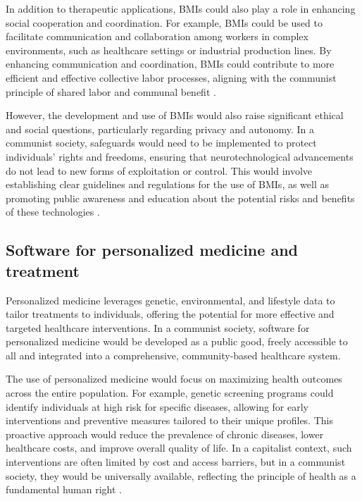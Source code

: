 In addition to therapeutic applications, BMIs could also play a role in enhancing social cooperation and coordination. For example, BMIs could be used to facilitate communication and collaboration among workers in complex environments, such as healthcare settings or industrial production lines. By enhancing communication and coordination, BMIs could contribute to more efficient and effective collective labor processes, aligning with the communist principle of shared labor and communal benefit \cite[pp.~300-305]{kim2021neuroscience}.

However, the development and use of BMIs would also raise significant ethical and social questions, particularly regarding privacy and autonomy. In a communist society, safeguards would need to be implemented to protect individuals' rights and freedoms, ensuring that neurotechnological advancements do not lead to new forms of exploitation or control. This would involve establishing clear guidelines and regulations for the use of BMIs, as well as promoting public awareness and education about the potential risks and benefits of these technologies \cite[pp.~310-315]{thompson2022bmi}.

\subsection{Software for personalized medicine and treatment}

Personalized medicine leverages genetic, environmental, and lifestyle data to tailor treatments to individuals, offering the potential for more effective and targeted healthcare interventions. In a communist society, software for personalized medicine would be developed as a public good, freely accessible to all and integrated into a comprehensive, community-based healthcare system.

The use of personalized medicine would focus on maximizing health outcomes across the entire population. For example, genetic screening programs could identify individuals at high risk for specific diseases, allowing for early interventions and preventive measures tailored to their unique profiles. This proactive approach would reduce the prevalence of chronic diseases, lower healthcare costs, and improve overall quality of life. In a capitalist context, such interventions are often limited by cost and access barriers, but in a communist society, they would be universally available, reflecting the principle of health as a fundamental human right \cite[pp.~330-335]{williams2020personalized}.


